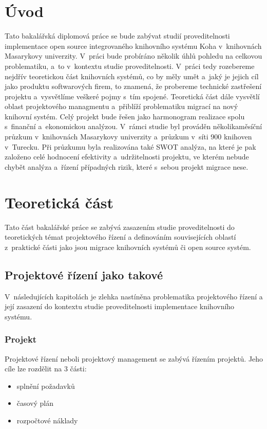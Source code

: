 \documentclass[
	11pt, oneside, printed, final, palatino, monochrome
	microtype,
	table,   %
	lof,     %
	lot     %
]{fithesis3}
\newcommand{\mezera}{\bigskip}
\begin{document}
{%

\chapter*{Úvod}
Tato bakalářská diplomová práce se bude zabývat studií proveditelnosti implementace open source integrovaného knihovního systému Koha v~knihovnách Masarykovy univerzity. V~práci bude probíráno několik úhlů pohledu na celkovou problematiku, a~to v~kontextu studie proveditelnosti.  V~práci tedy rozebereme nejdřív teoretickou část knihovních systémů, co by měly umět a~jaký je jejich cíl jako produktu softwarových firem, to znamená, že probereme technické zastřešení projektu a~vysvětlíme veškeré pojmy s~tím spojené. Teoretická část dále vysvětlí oblast projektového managmentu a~přiblíží problematiku migrací na nový knihovní systém. Celý projekt bude řešen jako harmonogram realizace spolu s~finanční a~ekonomickou analýzou. V~rámci studie byl prováděn několikaměsíční průzkum v~knihovnách Masarykovy univerzity a~průzkum v~síti 900 knihoven v~Turecku. Při průzkumu byla realizována také SWOT analýza, na které je pak založeno celé hodnocení efektivity a~udržitelnosti projektu, ve kterém nebude chybět analýza a~řízení případných rizik, které s~sebou projekt migrace nese.

\chapter{Teoretická část}

Tato část bakalářské práce se zabývá zasazením studie proveditelnosti do teoretických témat projektového řízení a definováním souvisejících oblastí z~praktické části jako jsou migrace knihovních systémů či open source systém.

\section{Projektové řízení jako takové} \label{sec:projektove_rizeni_jako_takove}

V~následujících kapitolách je zlehka nastíněna problematika projektového řízení a její zasazení do kontextu studie proveditelnosti implementace knihovního systému.


\subsection{Projekt}

Projektové řízení neboli projektový management se zabývá řízením projektů. Jeho cíle lze rozdělit na 3 části: 
\mezera
\begin{itemize}
\item splnění požadavků
\item časový plán
\item rozpočtové náklady
\end{itemize}

}
\end{document}
